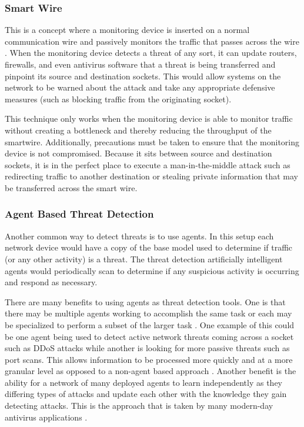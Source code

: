 \documentclass[conference, 12pt]{IEEEtran}
\begin{document}
\subsubsection{Smart Wire}
This is a concept where a monitoring device is inserted on a normal communication wire and passively monitors the traffic that passes across the wire \cite{herbert2015ddos}. When the monitoring device detects a threat of any sort, it can update routers, firewalls, and even antivirus software that a threat is being transferred and pinpoint its source and destination sockets. This would allow systems on the network to be warned about the attack and take any appropriate defensive measures (such as blocking traffic from the originating socket).

This technique only works when the monitoring device is able to monitor traffic without creating a bottleneck and thereby reducing the throughput of the smartwire. Additionally, precautions must be taken to ensure that the monitoring device is not compromised. Because it sits between source and destination sockets, it is in the perfect place to execute a man-in-the-middle attack such as redirecting traffic to another destination or stealing private information that may be transferred across the smart wire.

\subsubsection{Agent Based Threat Detection}
Another common way to detect threats is to use agents. In this setup each network device would have a copy of the base model used to determine if traffic (or any other activity) is a threat. The threat detection artificially intelligent agents would periodically scan to determine if any suspicious activity is occurring and respond as necessary.

There are many benefits to using agents as threat detection tools. One is that there may be multiple agents working to accomplish the same task or each may be specialized to perform a subset of the larger task \cite{arabo2019distributed}. One example of this could be one agent being used to detect active network threats coming across a socket such as DDoS attacks while another is looking for more passive threats such as port scans. This allows information to be processed more quickly and at a more granular level as opposed to a non-agent based approach \cite{arabo2019distributed}. Another benefit is the ability for a network of many deployed agents to learn independently as they differing types of attacks and update each other with the knowledge they gain detecting attacks. This is the approach that is taken by many modern-day antivirus applications \cite{arabo2019distributed}.
\end{document}
